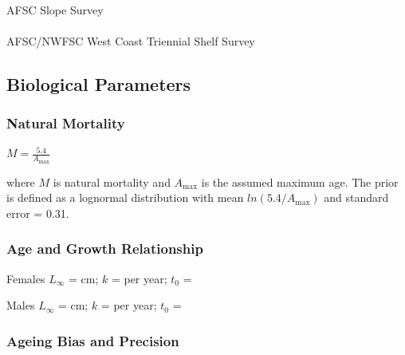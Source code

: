 \documentclass[
]{scrartcl}
\makeatletter
\let\oldparagraph\paragraph
\renewcommand{\paragraph}{
    \@ifstar
      \xxxParagraphStar
      \xxxParagraphNoStar
  }
\newcommand{\xxxParagraphStar}[1]{\oldparagraph*{#1}\mbox{}}
\newcommand{\xxxParagraphNoStar}[1]{\oldparagraph{#1}\mbox{}}
\makeatother
\begin{document}
\paragraph{AFSC Slope Survey}\label{afsc-slope-survey-1}

\paragraph{AFSC/NWFSC West Coast Triennial Shelf
Survey}\label{afscnwfsc-west-coast-triennial-shelf-survey-1}

\subsection{Biological Parameters}\label{biological-parameters}

\subsubsection{Natural Mortality}\label{natural-mortality}

\begin{centering}

$M=\frac{5.4}{A_{\text{max}}}$

\end{centering}

\vspace{0.5cm}

where \(M\) is natural mortality and \({A_{\text{max}}}\) is the assumed
maximum age. The prior is defined as a lognormal distribution with mean
\(ln(5.4/A_{\text{max}})\) and standard error = 0.31.

\subsubsection{Age and Growth
Relationship}\label{age-and-growth-relationship}

\begin{centering}

Females $L_{\infty}$ =  cm; $k$ =  per year; $t_0$ = 

Males $L_{\infty}$ =  cm; $k$ =  per year; $t_0$ = 

\end{centering}

\subsubsection{Ageing Bias and
Precision}\label{ageing-bias-and-precision}
\end{document}
